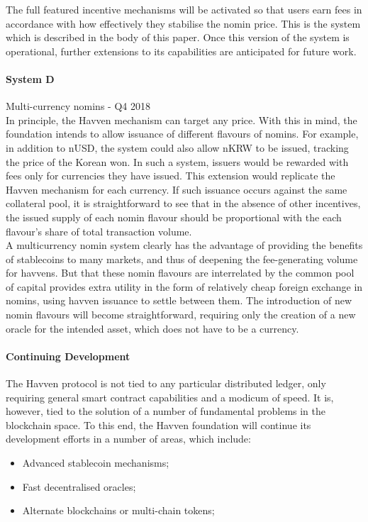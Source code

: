 \noindent The full featured incentive mechanisms will be activated so that users earn fees
in accordance with how effectively they stabilise the nomin price. This is the
system which is described in the body of this paper. Once this version of the system
is operational, further extensions to its capabilities are anticipated for future work. \\


\paragraph{System D} Multi-currency nomins - Q4 2018 \\

\noindent In principle, the Havven mechanism can target any price. 
With this in mind, the foundation intends to allow issuance
of different flavours of nomins. For example, in addition to 
nUSD, the system could also allow nKRW to be issued, tracking
the price of the Korean won. In such a system, issuers would be
rewarded with fees only for currencies they have issued. This extension
would replicate the Havven mechanism for each currency. 
If such issuance occurs against the same collateral pool, it is
straightforward to see that in the absence of other incentives,
the issued supply of each nomin flavour should be proportional with the
each flavour's share of total transaction volume. \\

\noindent A multicurrency nomin system clearly has the advantage of providing the
benefits of stablecoins to many markets, and thus of deepening
the fee-generating volume for havvens. But that these nomin flavours
are interrelated by the common pool of capital provides extra utility
in the form of relatively cheap foreign exchange in nomins, using 
havven issuance to settle between them.
The introduction of new nomin flavours will become straightforward,
requiring only the creation of a new oracle for the intended asset,
which does not have to be a currency. \\


\paragraph{Continuing Development}

\noindent The Havven protocol is not tied to any particular distributed ledger,
only requiring general smart contract capabilities and a modicum of speed.
It is, however, tied to the solution of a number of fundamental problems
in the blockchain space. To this end, the Havven foundation will continue
its development efforts in a number of areas, which include:

\begin{itemize}
    \item Advanced stablecoin mechanisms;
    \item Fast decentralised oracles;
    \item Alternate blockchains or multi-chain tokens;
\end{itemize}


